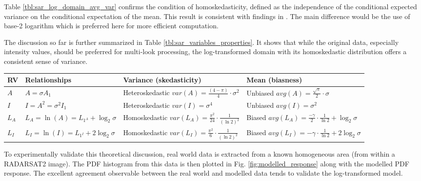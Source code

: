 Table \ref{tbl:sar_log_domain_avg_var} confirms the condition of homoskedasticity,  
defined as the independence of the conditional expected variance on the conditional expectation of the mean. 
This result is consistent with findings in \cite{Arsenault_JOptSocAm_1976}. 
The main difference would be the use of base-2 logarithm which is preferred here for more efficient computation. 

The discussion so far is further summarized in Table \ref{tbl:sar_variables_properties}.
It shows that while the original data, especially intensity values, should be preferred for 
multi-look processing, the log-transformed domain with its homoskedastic distribution offers a consistent sense of variance. 

\begin{table*}[t]
\scriptsize
\centering

\caption{ The properties of observable SAR random variables }
\label{tbl:sar_variables_properties}

\begin{tabular}{|l|l|l|l|}
\hline
 RV & Relationships  & Variance (skedasticity) & Mean (biasness) \\
\hline
$A$ 
	& $A=\sigma A_1 $ 
	& Heteroskedastic $var(A) = \frac{(4-\pi)}{4} \cdot \sigma^2 $ 
	& Unbiased $avg(A) = \frac{\sqrt{\pi}}{2} \cdot \sigma $ \\
$I$ 
	& $I=A^2=\sigma^2 I_1 $ 
	& Heteroskedastic $ var(I) = \sigma^4$ 
	& Unbiased $avg(I) = \sigma^2 $\\
$L_A$ 
	& $L_A=\ln(A)=L_{1^A} + \log_2{\sigma}$ 
	& Homoskedastic $var(L_A) = \frac{ \pi ^2}{24} \cdot \frac{1}{(\ln2)^2}$ 
	& Biased $avg(L_A) = \frac{ - \gamma }{2} \cdot \frac{1}{\ln2} + \log_2{\sigma}$ \\
$L_I$ 
	& $L_I=\ln(I)=L_{1^I} + 2 \log_2{\sigma}$  
	& Homoskedastic $var(L_I) = \frac{ \pi ^2}{6} \cdot \frac{1}{(\ln2)^2}$ 
	& Biased $avg(L_I) = - \gamma \cdot \frac{1}{\ln2} + 2 \log_2{\sigma}  $ \\
\hline
\end{tabular}

\end{table*}

To experimentally validate this theoretical discussion, real world data is extracted from a known  homogeneous area (from within a RADARSAT2 image). The PDF histogram from this data is then plotted in 
Fig. \ref{fig:modelled_response} along with the modelled PDF response. 
The excellent agreement observable between the real world and modelled data tends to validate the log-transformed model. 

